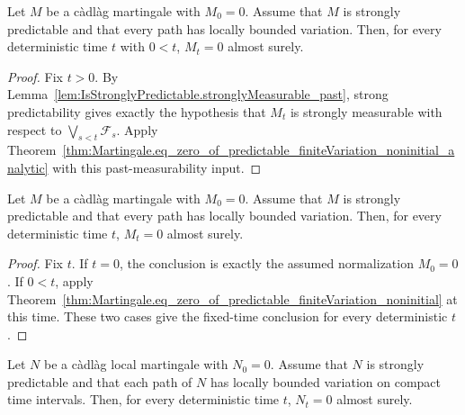 \begin{theorem}\label{thm:Martingale.eq_zero_of_predictable_finiteVariation_noninitial}
Let \(M\) be a càdlàg martingale with \(M_0=0\).  Assume that \(M\) is
strongly predictable and that every path has locally bounded variation.
Then, for every deterministic time \(t\) with \(0<t\), \(M_t=0\) almost
surely.
\end{theorem}

\begin{proof}
Fix \(t>0\).  By
Lemma~\ref{lem:IsStronglyPredictable.stronglyMeasurable_past}, strong
predictability gives exactly the hypothesis that \(M_t\) is strongly
measurable with respect to \(\bigvee_{s<t}\mathcal F_s\).  Apply
Theorem~\ref{thm:Martingale.eq_zero_of_predictable_finiteVariation_noninitial_analytic}
with this past-measurability input.
\end{proof}


\begin{theorem}\label{thm:Martingale.eq_zero_of_predictable_finiteVariation}
Let \(M\) be a càdlàg martingale with \(M_0=0\).  Assume that \(M\) is
strongly predictable and that every path has locally bounded variation.
Then, for every deterministic time \(t\), \(M_t=0\) almost surely.
\end{theorem}

\begin{proof}
Fix \(t\).  If \(t=0\), the conclusion is exactly the assumed normalization
\(M_0=0\).  If \(0<t\), apply
Theorem~\ref{thm:Martingale.eq_zero_of_predictable_finiteVariation_noninitial}
at this time.  These two cases give the fixed-time conclusion for every
deterministic \(t\).
\end{proof}


\begin{theorem}\label{thm:IsLocalMartingale.eq_zero_of_predictable_finiteVariation}
  \leanok
Let \(N\) be a càdlàg local martingale with \(N_0=0\).  Assume that \(N\)
is strongly predictable and that each path of \(N\) has locally bounded
variation on compact time intervals.  Then, for every deterministic time
\(t\), \(N_t=0\) almost surely.
\end{theorem}

